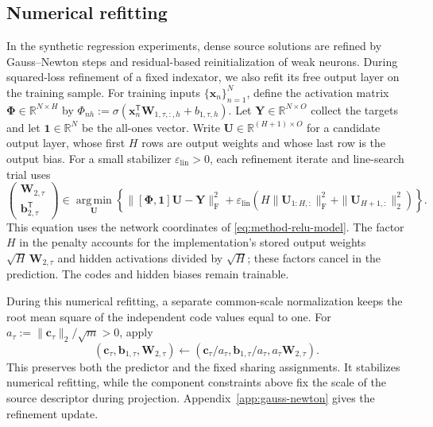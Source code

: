 \subsection{Numerical refitting}
\label{app:relu-numerical}

In the synthetic regression experiments, dense source solutions are
refined by Gauss--Newton steps and residual-based reinitialization
of weak neurons. During squared-loss refinement of a fixed
indexator, we also refit its free output layer on the training sample.
For training inputs $\{\mathbf x_n\}_{n=1}^N$, define the activation
matrix $\boldsymbol\Phi\in\mathbb R^{N\times H}$ by
$\Phi_{nh}:=\sigma(\mathbf x_n^{\mathsf T}
\mathbf W_{1,\tau,:,h}+b_{1,\tau,h})$.
Let $\mathbf Y\in\mathbb R^{N\times O}$ collect the targets and
let $\mathbf1\in\mathbb R^N$ be the all-ones vector.
Write $\mathbf U\in\mathbb R^{(H+1)\times O}$ for a candidate
output layer, whose first $H$ rows are output weights and whose
last row is the output bias. For a small stabilizer
$\varepsilon_{\mathrm{lin}}>0$, each refinement iterate and
line-search trial uses
\begin{equation}
    \begin{pmatrix}
        \mathbf W_{2,\tau}\\\mathbf b_{2,\tau}^{\mathsf T}
    \end{pmatrix}
    \in\operatorname*{arg\,min}_{\mathbf U}
        \left\{\|[\boldsymbol\Phi,\mathbf1]\mathbf U-\mathbf Y\|_{\mathrm F}^2
            +\varepsilon_{\mathrm{lin}}\left(
                H\|\mathbf U_{1:H,:}\|_{\mathrm F}^2
                +\|\mathbf U_{H+1,:}\|_2^2\right)\right\}.
    \label{eq:method-free-head}
\end{equation}
This equation uses the network coordinates of
\eqref{eq:method-relu-model}. The factor $H$ in the penalty accounts
for the implementation's stored output weights
$\sqrt H\,\mathbf W_{2,\tau}$ and hidden activations divided by
$\sqrt H$; these factors cancel in the prediction.
The codes and hidden biases remain trainable.

During this numerical refitting, a separate common-scale normalization
keeps the root mean square of the independent code values equal to
one. For $a_\tau:=\|\mathbf c_\tau\|_2/\sqrt m>0$, apply
\begin{equation}
    (\mathbf c_\tau,\mathbf b_{1,\tau},\mathbf W_{2,\tau})
    \leftarrow
    (\mathbf c_\tau/a_\tau,\mathbf b_{1,\tau}/a_\tau,
        a_\tau\mathbf W_{2,\tau}).
    \label{eq:method-relu-refit-normalization}
\end{equation}
This preserves both the predictor and the fixed sharing assignments.
It stabilizes numerical refitting, while the component constraints
above fix the scale of the source descriptor during projection.
Appendix~\ref{app:gauss-newton} gives the refinement update.

